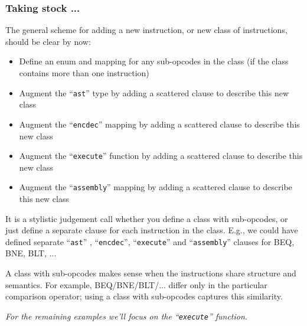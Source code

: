 \documentclass[aspectratio=169]{beamer}
\newcommand{\slidefont}{\scriptsize}
\newcommand{\cf}{\scriptsize\tt}
\begin{document}
\begin{frame}[fragile]
  \frametitle{Taking stock ...}

  \slidefont

  The general scheme for adding a new instruction, or new class of instructions, should be clear by now:
  \begin{itemize}
    \item Define an enum and mapping for any sub-opcodes in the class
      (if the class contains more than one instruction)
    \item Augment the ``{\cf ast}'' type by adding a scattered clause to describe this new class
    \item Augment the ``{\cf encdec}'' mapping by adding a scattered clause to describe this new class
    \item Augment the ``{\cf execute}'' function by adding a scattered clause to describe this new class
    \item Augment the ``{\cf assembly}'' mapping by adding a scattered clause to describe this new class
  \end{itemize}

  \vspace{1ex}

  It is a stylistic judgement call whether you define a class with
  sub-opcodes, or just define a separate clause for each instruction
  in the class.  E.g., we could have defined separate ``{\cf ast}'' ,
  ``{\cf encdec}'', ``{\cf execute}'' and ``{\cf assembly}'' clauses
  for BEQ, BNE, BLT, ...

  \vspace{1ex}

  A class with sub-opcodes makes sense when the instructions share
  structure and semantics.  For example, BEQ/BNE/BLT/... differ only
  in the particular comparison operator; using a class with
  sub-opcodes captures this similarity.

  \vspace{1ex}

  \centering
  \emph{For the remaining examples we'll focus on the ``{\cf execute}'' function.}

\end{frame}

\end{document}
